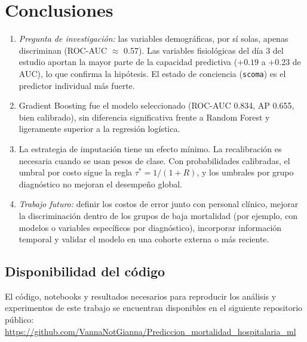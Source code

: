 \documentclass[conference]{IEEEtran}
\begin{document}
\section{Conclusiones}
\begin{enumerate}
\item \textit{Pregunta de investigación:} las variables demográficas, por sí solas, apenas discriminan (ROC-AUC $\approx$ 0.57). Las variables fisiológicas del día 3 del estudio aportan la mayor parte de la capacidad predictiva ($+0.19$ a $+0.23$ de AUC), lo que confirma la hipótesis. El estado de conciencia (\texttt{scoma}) es el predictor individual más fuerte.
\item Gradient Boosting fue el modelo seleccionado (ROC-AUC 0.834, AP 0.655, bien calibrado), sin diferencia significativa frente a Random Forest y ligeramente superior a la regresión logística.
\item La estrategia de imputación tiene un efecto mínimo. La recalibración es necesaria cuando se usan pesos de clase. Con probabilidades calibradas, el umbral por costo sigue la regla $\tau^*=1/(1+R)$, y los umbrales por grupo diagnóstico no mejoran el desempeño global.
\item \textit{Trabajo futuro:} definir los costos de error junto con personal clínico, mejorar la discriminación dentro de los grupos de baja mortalidad (por ejemplo, con modelos o variables específicos por diagnóstico), incorporar información temporal y validar el modelo en una cohorte externa o más reciente.
\end{enumerate}

\subsection*{Disponibilidad del código}
El código, notebooks y resultados necesarios para reproducir los análisis y experimentos de este trabajo se encuentran disponibles en el siguiente repositorio público:
\url{https://github.com/VannaNotGianna/Prediccion_mortalidad_hospitalaria_ml}
\end{document}
